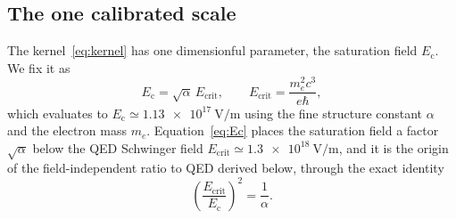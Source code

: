 \documentclass[aps,prd,twocolumn,superscriptaddress,nofootinbib,longbibliography]{revtex4-2}
\newcommand{\Ec}{E_{\mathrm{c}}}
\newcommand{\Ecrit}{E_{\mathrm{crit}}}
\begin{document}
\subsection{The one calibrated scale}

The kernel~\eqref{eq:kernel} has one dimensionful parameter, the saturation
field $\Ec$. We fix it as
%
\begin{equation}
  \Ec=\sqrt{\alpha}\,\Ecrit,\qquad
  \Ecrit=\frac{m_e^2c^3}{e\hbar},
  \label{eq:Ec}
\end{equation}
%
which evaluates to $\Ec\simeq\SI{1.13e17}{\volt\per\meter}$ using the fine
structure constant $\alpha$ and the electron mass $m_e$. Equation~\eqref{eq:Ec}
places the saturation field a factor $\sqrt{\alpha}$ below the QED Schwinger
field $\Ecrit\simeq\SI{1.3e18}{\volt\per\meter}$, and it is the origin of the
field-independent ratio to QED derived below, through the exact identity
%
\begin{equation}
  \left(\frac{\Ecrit}{\Ec}\right)^2=\frac1\alpha .
  \label{eq:identity}
\end{equation}
\end{document}
